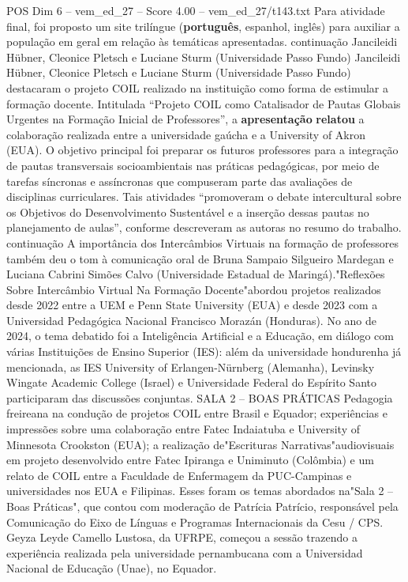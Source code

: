 \begin{textsample}{POS Dim 6 – vem\_ed\_27 – Score 4.00 – vem\_ed\_27/t143.txt}
Para atividade final, foi proposto um site trilíngue (\textbf{português}, espanhol, inglês) para auxiliar a população em geral em relação às temáticas apresentadas. continuação Jancileidi Hübner, Cleonice Pletsch e Luciane Sturm (Universidade Passo Fundo) Jancileidi Hübner, Cleonice Pletsch e Luciane Sturm (Universidade Passo Fundo) destacaram o projeto COIL realizado na instituição como forma de estimular a formação docente.
Intitulada “Projeto COIL como Catalisador de Pautas Globais Urgentes na Formação Inicial de Professores”, a \textbf{apresentação} \textbf{relatou} a colaboração realizada entre a universidade gaúcha e a University of Akron (EUA).
O objetivo principal foi preparar os futuros professores para a integração de pautas transversais socioambientais nas práticas pedagógicas, por meio de tarefas síncronas e assíncronas que compuseram parte das avaliações de disciplinas curriculares.
Tais atividades “promoveram o debate intercultural sobre os Objetivos do Desenvolvimento Sustentável e a inserção dessas pautas no planejamento de aulas”, conforme descreveram as autoras no resumo do trabalho. continuação A importância dos Intercâmbios Virtuais na formação de professores também deu o tom à comunicação oral de Bruna Sampaio Silgueiro Mardegan e Luciana Cabrini Simões Calvo (Universidade Estadual de Maringá)."Reflexões Sobre Intercâmbio Virtual Na Formação Docente"abordou projetos realizados desde 2022 entre a UEM e Penn State University (EUA) e desde 2023 com a Universidad Pedagógica Nacional Francisco Morazán (Honduras).
No ano de 2024, o tema debatido foi a Inteligência Artificial e a Educação, em diálogo com várias Instituições de Ensino Superior (IES): além da universidade hondurenha já mencionada, as IES University of Erlangen-Nürnberg (Alemanha), Levinsky Wingate Academic College (Israel) e Universidade Federal do Espírito Santo participaram das discussões conjuntas.
SALA 2 – BOAS PRÁTICAS Pedagogia freireana na condução de projetos COIL entre Brasil e Equador; experiências e impressões sobre uma colaboração entre Fatec Indaiatuba e University of Minnesota Crookston (EUA); a realização de"Escrituras Narrativas"audiovisuais em projeto desenvolvido entre Fatec Ipiranga e Uniminuto (Colômbia) e um relato de COIL entre a Faculdade de Enfermagem da PUC-Campinas e universidades nos EUA e Filipinas.
Esses foram os temas abordados na"Sala 2 – Boas Práticas", que contou com moderação de Patrícia Patrício, responsável pela Comunicação do Eixo de Línguas e Programas Internacionais da Cesu / CPS.
Geyza Leyde Camello Lustosa, da UFRPE, começou a sessão trazendo a experiência realizada pela universidade pernambucana com a Universidad Nacional de Educação (Unae), no Equador.

\end{textsample}

